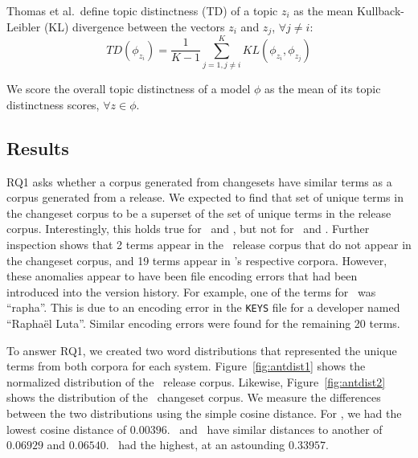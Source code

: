 Thomas et al.\ define topic distinctness (TD) of a topic $z_i$ as the mean
Kullback-Leibler (KL) divergence between the vectors $z_i$ and $z_j$, $\forall j \neq i$:
\begin{equation}
TD(\phi_{z_i}) =
\frac{1}{K - 1}
\sum_{j=1,j \neq i}^{K}
KL(\phi_{z_i}, \phi_{z_j})
\label{eq:topicdistinctness}
\end{equation}

We score the overall topic distinctness of a model $\phi$ as the mean of
its topic distinctness scores, $\forall z \in \phi$.

\subsection{Results}


RQ1 asks whether a corpus generated from changesets have similar terms
as a corpus generated from a release.
We expected to find that set of unique terms in the changeset corpus to be
a superset of the set of unique terms in the release corpus.
Interestingly, this holds true for \jodatime\ and \aspectj,
but not for \ant\ and \postgres.
Further inspection shows that 2 terms appear in the \ant\ release corpus that do not appear in the changeset corpus,
and 19 terms appear in \postgres's respective corpora.
However, these anomalies appear to have been file encoding errors that
had been introduced into the version history.
For example, one of the terms for \ant\ was ``rapha''. This is due
to an encoding error in the \texttt{KEYS} file for a developer named
``Rapha\"{e}l Luta''. 
Similar encoding errors were found for the remaining 20 terms.

To answer RQ1, we created two word distributions that represented the unique
terms from both corpora for each system.
Figure~\ref{fig:antdist1} shows the normalized distribution of the \ant\ release corpus.
Likewise, Figure~\ref{fig:antdist2} shows the distribution of the \ant\ changeset corpus.
We measure the differences between the two distributions using the simple
cosine distance. For \ant, we had the lowest cosine distance of $0.00396$.
\aspectj\ and \jodatime\ have similar distances to another of $0.06929$ and
$0.06540$. \postgres\ had the highest, at an astounding $0.33957$.

